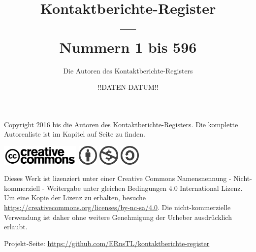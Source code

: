 \documentclass[ngerman,10pt]{book}
\title{Kontaktberichte-Register \\ --- \\ \Large{Nummern 1 bis 596}}
\author{Die Autoren des Kontaktberichte-Registers}
\date{!!DATEN-DATUM!!}%
\begin{document}
\frontmatter



\maketitle




\thispagestyle{empty}
\null    %
\vfill

\noindent Copyright {\textcopyright} 2016 bis {\the\year} die Autoren des Kontaktberichte-Registers. Die komplette Autorenliste ist im Kapitel \emph{} auf Seite \pageref{ch:mitwirkende} zu finden.%

\vspace{2mm}

\includegraphics[height=10mm,keepaspectratio=true]{CreativeCommons_logo_trademark}
\includegraphics[height=10mm,keepaspectratio=true]{chooser_by} \includegraphics[height=10mm,keepaspectratio=true]{chooser_nc} \includegraphics[height=10mm,keepaspectratio=true]{chooser_sa}

\vspace{2mm}

\noindent Dieses Werk ist lizenziert unter einer Creative Commons Namensnennung - Nicht-kommerziell - Weitergabe unter gleichen Bedingungen 4.0 International Lizenz. Um eine Kopie der Lizenz zu erhalten, besuche \url{https://creativecommons.org/licenses/by-nc-sa/4.0}. Die nicht-kommerzielle Verwendung ist daher ohne weitere Genehmigung der Urheber ausdrücklich erlaubt.

\vspace{2mm}

\noindent Projekt-Seite: \url{https://github.com/ERnsTL/kontaktberichte-register}
\end{document}
